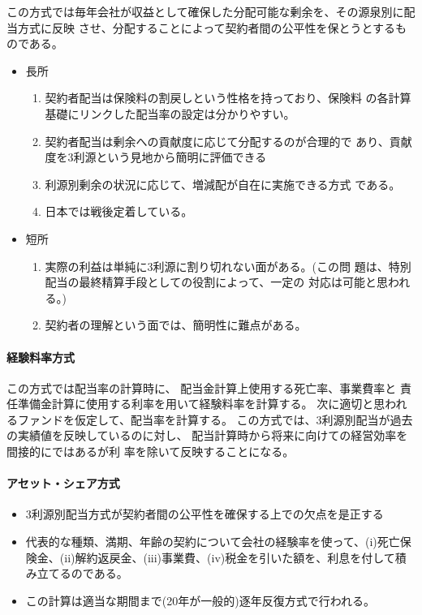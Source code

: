 \documentclass[report,gutter=10mm,fore-edge=10mm,uplatex,dvipdfmx]{jlreq}
\begin{document}
この方式では毎年会社が収益として確保した分配可能な剰余を、その源泉別に配当方式に反映
させ、分配することによって契約者間の公平性を保とうとするものである。
\begin{itemize}
 \item 長所
\begin{enumerate}[i]
 \item 契約者配当は保険料の割戻しという性格を持っており、保険料
の各計算基礎にリンクした配当率の設定は分かりやすい。
 \item 契約者配当は剰余への貢献度に応じて分配するのが合理的で
あり、貢献度を3利源という見地から簡明に評価できる
 \item 利源別剰余の状況に応じて、増減配が自在に実施できる方式
である。
 \item 日本では戦後定着している。
\end{enumerate}
 \item 短所
\begin{enumerate}
 \item 実際の利益は単純に3利源に割り切れない面がある。(この問
題は、特別配当の最終精算手段としての役割によって、一定の
対応は可能と思われる。)
 \item 契約者の理解という面では、簡明性に難点がある。
\end{enumerate}
\end{itemize}

\paragraph{経験料率方式}
この方式では配当率の計算時に、
配当金計算上使用する死亡率、事業費率と
責任準備金計算に使用する利率を用いて経験料率を計算する。
次に適切と思われるファンドを仮定して、配当率を計算する。
この方式では、3利源別配当が過去の実績値を反映しているのに対し、
配当計算時から将来に向けての経営効率を間接的にではあるが利
率を除いて反映することになる。

\paragraph{アセット・シェア方式}

\begin{itemize}
 \item 3利源別配当方式が契約者間の公平性を確保する上での欠点を是正する
 \item 代表的な種類、満期、年齢の契約について会社の経験率を使って、(i)死亡保険金、(ii)解約返戻金、(iii)事業費、(iv)税金を引いた額を、利息を付して積み立てるのである。
 \item この計算は適当な期間まで(20年が一般的)逐年反復方式で行われる。
\end{itemize}
\end{document}
